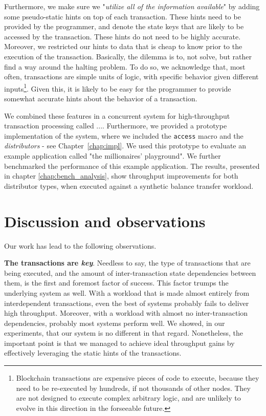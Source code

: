 Furthermore, we make sure we "\textit{utilize all of the information available}" by adding some pseudo-static hints on
top of each transaction. These  hints need to be provided by the programmer, and denote the state keys that
are likely to be accessed by the transaction. These hints do not need to be highly accurate. 
Moreover, we restricted our hints to data that is cheap to know prior to the execution of the transaction.
Basically, the dilemma is to, not solve, but rather find a way around the halting
problem\cite{burkholderHaltingProblem1987}. To do so, we acknowledge that, most often, transactions are
simple units of logic, with specific behavior given different inputs\footnote{Blockchain
transactions are expensive pieces of code to execute, because they need to be re-executed by hundreds,
if not thousands of other nodes. They are not designed to execute complex arbitrary logic, and are unlikely to
evolve in this direction in the forseeable future.}. Given this, it is likely to be easy for the programmer to
provide somewhat accurate hints about the behavior of a transaction.

We combined these features in a concurrent system for high-throughput transaction processing called .... 
Furthermore, we provided a prototype implementation of the system, where we included 
the \texttt{access} macro and the \textit{distributors} - see Chapter~\ref{chap:impl}. 
We used this prototype to evaluate an example application called "the millionaires' playground". 
We further benchmarked the performance of this example application. The results, presented
in chapter \ref{chap:bench_analysis}, show throughput improvements for both
distributor types, when executed against a synthetic balance transfer workload.



\section{Discussion and observations}
Our work has lead to the following observations. 

\textbf{The transactions are \textit{key}}. Needless to say, the type of transactions that are
being executed, and the amount of inter-transaction state dependencies between them, is the first and
foremost factor of success. This factor trumps the underlying system as well. With a workload that
is made almost entirely from interdependent transactions, even the best of systems probably fails to deliver
high throughput. Moreover, with a workload with almost no inter-transaction dependencies, probably
most systems perform well. We showed, in our experiments, that our system is no different in that
regard. Nonetheless, the important point is that we managed to achieve ideal throughput gains by
effectively leveraging the static hints of the transactions.

